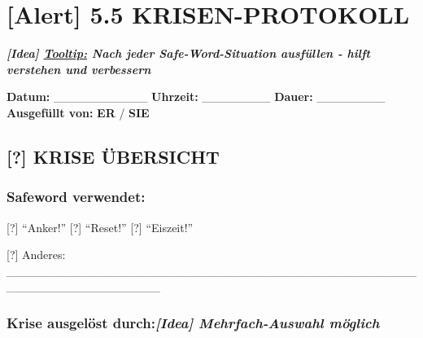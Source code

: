 \hypertarget{krisen-protokoll}{%
\section{\texorpdfstring{\textbf{[Alert] 5.5 KRISEN-PROTOKOLL}}{[Alert] 5.5 KRISEN-PROTOKOLL}}\label{krisen-protokoll}}

\emph{\textbf{[Idea] \ul{Tooltip:} Nach jeder Safe-Word-Situation ausfüllen - hilft verstehen und verbessern}}

\textbf{Datum:} \_\_\_\_\_\_\_\_\_\_\_ \textbf{Uhrzeit:} \_\_\_\_\_\_\_\_ \textbf{Dauer:} \_\_\_\_\_\_\_\_ \textbf{Ausgefüllt von:} \textbf{ER} / \textbf{SIE}

\hypertarget{krise-uxfcbersicht}{%
\subsection{\texorpdfstring{\textbf{[?] KRISE ÜBERSICHT}}{[?] KRISE ÜBERSICHT}}\label{krise-uxfcbersicht}}

\hypertarget{safeword-verwendet}{%
\subsubsection{\texorpdfstring{\textbf{Safeword verwendet:}}{Safeword verwendet:}}\label{safeword-verwendet}}

[?] ``Anker!'' [?] ``Reset!'' [?] ``Eiszeit!''

[?] Anderes: \_\_\_\_\_\_\_\_\_\_\_\_\_\_\_\_\_\_\_\_\_\_\_\_\_\_\_\_\_\_\_\_\_\_\_\_\_\_\_\_\_\_\_\_\_\_\_\_\_\_\_\_\_\_\_\_\_\_\_\_\_\_\_\_\_\_

\hypertarget{krise-ausgeluxf6st-durch-mehrfach-auswahl-muxf6glich}{%
\subsubsection{\texorpdfstring{\textbf{Krise ausgelöst durch:\emph{[Idea] Mehrfach-Auswahl möglich}} }{Krise ausgelöst durch:[Idea] Mehrfach-Auswahl möglich }}\label{krise-ausgeluxf6st-durch-mehrfach-auswahl-muxf6glich}}

